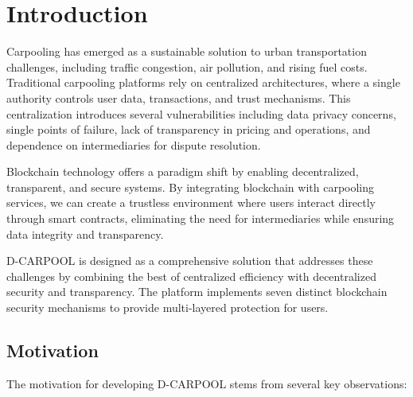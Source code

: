 \chapter{Introduction}

Carpooling has emerged as a sustainable solution to urban transportation challenges, including traffic congestion, air pollution, and rising fuel costs. Traditional carpooling platforms rely on centralized architectures, where a single authority controls user data, transactions, and trust mechanisms. This centralization introduces several vulnerabilities including data privacy concerns, single points of failure, lack of transparency in pricing and operations, and dependence on intermediaries for dispute resolution.

Blockchain technology offers a paradigm shift by enabling decentralized, transparent, and secure systems. By integrating blockchain with carpooling services, we can create a trustless environment where users interact directly through smart contracts, eliminating the need for intermediaries while ensuring data integrity and transparency.

D-CARPOOL is designed as a comprehensive solution that addresses these challenges by combining the best of centralized efficiency with decentralized security and transparency. The platform implements seven distinct blockchain security mechanisms to provide multi-layered protection for users.

\section{Motivation}

The motivation for developing D-CARPOOL stems from several key observations:

